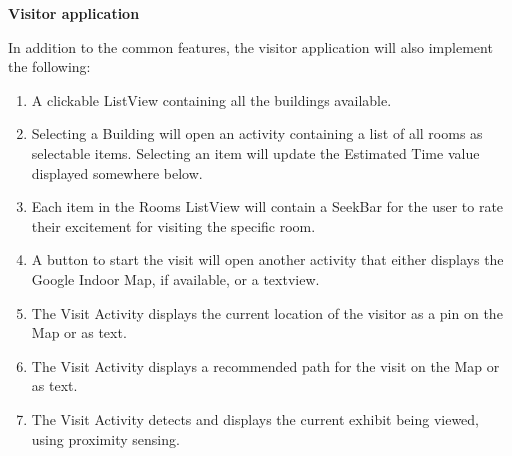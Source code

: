 \noindent \textbf{Visitor application}

In addition to the common features, the visitor application will also implement the following:
\begin{enumerate}
\item A clickable ListView containing all the buildings available.
\item Selecting a Building will open an activity containing a list of all rooms as selectable items. Selecting an item will update the Estimated Time value displayed somewhere below.
\item Each item in the Rooms ListView will contain a SeekBar for the user to rate their excitement for visiting the specific room.
\item A button to start the visit will open another activity that either displays the Google Indoor Map, if available, or a textview.
\item The Visit Activity displays the current location of the visitor as a pin on the Map or as text.
\item The Visit Activity displays a recommended path for the visit on the Map or as text.
\item The Visit Activity detects and displays the current exhibit being viewed, using proximity sensing.
\end{enumerate}

